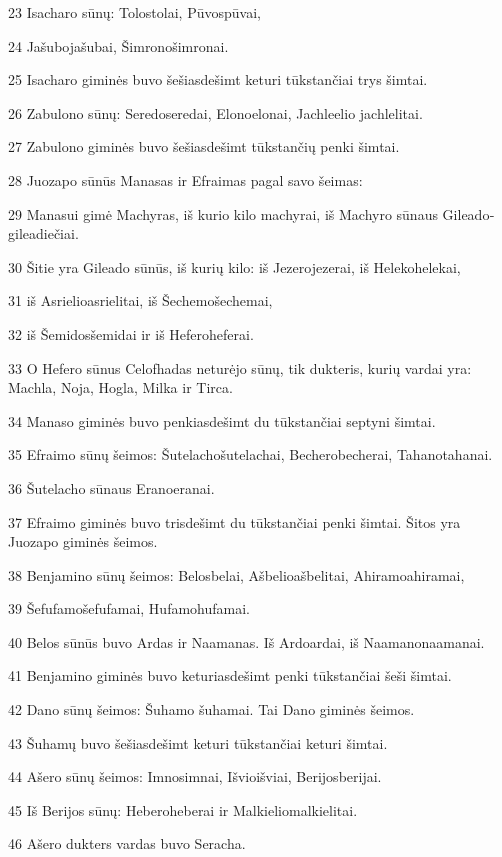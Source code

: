 \par 23 Isacharo sūnų: Tolos­tolai, Pūvos­pūvai, 
\par 24 Jašubo­jašubai, Šimrono­šimronai. 
\par 25 Isacharo giminės buvo šešiasdešimt keturi tūkstančiai trys šimtai. 
\par 26 Zabulono sūnų: Seredo­seredai, Elono­elonai, Jachleelio­ jachlelitai. 
\par 27 Zabulono giminės buvo šešiasdešimt tūkstančių penki šimtai. 
\par 28 Juozapo sūnūs Manasas ir Efraimas pagal savo šeimas: 
\par 29 Manasui gimė Machyras, iš kurio kilo machyrai, iš Machyro sūnaus Gileado­gileadiečiai. 
\par 30 Šitie yra Gileado sūnūs, iš kurių kilo: iš Jezero­jezerai, iš Heleko­helekai, 
\par 31 iš Asrielio­asrielitai, iš Šechemo­šechemai, 
\par 32 iš Šemidos­šemidai ir iš Hefero­heferai. 
\par 33 O Hefero sūnus Celofhadas neturėjo sūnų, tik dukteris, kurių vardai yra: Machla, Noja, Hogla, Milka ir Tirca. 
\par 34 Manaso giminės buvo penkiasdešimt du tūkstančiai septyni šimtai. 
\par 35 Efraimo sūnų šeimos: Šutelacho­šutelachai, Bechero­becherai, Tahano­tahanai. 
\par 36 Šutelacho sūnaus Erano­eranai. 
\par 37 Efraimo giminės buvo trisdešimt du tūkstančiai penki šimtai. Šitos yra Juozapo giminės šeimos. 
\par 38 Benjamino sūnų šeimos: Belos­belai, Ašbelio­ašbelitai, Ahiramo­ahiramai, 
\par 39 Šefufamo­šefufamai, Hufamo­hufamai. 
\par 40 Belos sūnūs buvo Ardas ir Naamanas. Iš Ardo­ardai, iš Naamano­naamanai. 
\par 41 Benjamino giminės buvo keturiasdešimt penki tūkstančiai šeši šimtai. 
\par 42 Dano sūnų šeimos: Šuhamo­ šuhamai. Tai Dano giminės šeimos. 
\par 43 Šuhamų buvo šešiasdešimt keturi tūkstančiai keturi šimtai. 
\par 44 Ašero sūnų šeimos: Imnos­imnai, Išvio­išviai, Berijos­berijai. 
\par 45 Iš Berijos sūnų: Hebero­heberai ir Malkielio­malkielitai. 
\par 46 Ašero dukters vardas buvo Seracha. 
